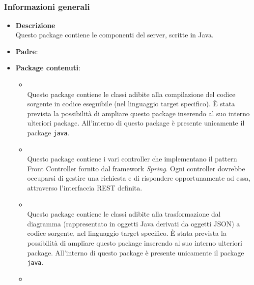 


\subsection{}
\label{\nogloxy{swedesigner::server}}
\subsubsection{Informazioni generali}
\begin{itemize}
\item \textbf{Descrizione}\\
Questo package contiene le componenti del server, scritte in Java.
\item \textbf{Padre}: \hyperref[\nogloxy{swedesigner}]{}
\item \textbf{Package contenuti}:
\begin{itemize}
\item \hyperref[\nogloxy{swedesigner::server::compiler}]{}\\
Questo package contiene le classi adibite alla compilazione del codice sorgente in codice eseguibile (nel linguaggio target specifico). È stata prevista la possibilità di ampliare questo package inserendo al suo interno ulteriori package. All'interno di questo package è presente unicamente il package \texttt{java}.
\item \hyperref[\nogloxy{swedesigner::server::controller}]{}\\
Questo package contiene i vari controller che implementano il pattern Front Controller fornito dal framework \emph{Spring}. Ogni controller dovrebbe occuparsi di gestire una richiesta e di rispondere opportunamente ad essa, attraverso l'interfaccia REST definita.
\item \hyperref[\nogloxy{swedesigner::server::generator}]{}\\
Questo package contiene le classi adibite alla trasformazione dal diagramma (rappresentato in oggetti Java derivati da oggetti JSON) a codice sorgente, nel linguaggio target specifico. È stata prevista la possibilità di ampliare questo package inserendo al suo interno ulteriori package. All'interno di questo package è presente unicamente il package \texttt{java}.
\item \hyperref[\nogloxy{swedesigner::server::parser}]{}\\

\end{itemize}
\end{itemize}
